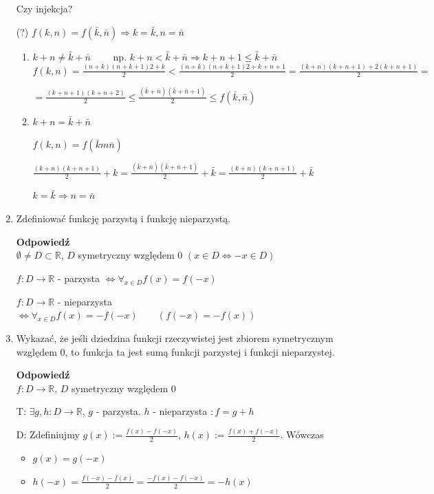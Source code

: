 \documentclass[12pt,a4paper]{article}
\theoremstyle{break}
\newcommand{\Odp}[1]{
		\begin{mdframed}[style=zadanie]
			\textbf{Odpowiedź}\\
			#1
		\end{mdframed}
	}
\begin{document}
\begin{enumerate}[1.]
{		Czy injekcja?	
		
		(?) $f(k,n) = f(\bar{k},\bar{n})\Rightarrow k=\bar{k}, n=\bar{n}$
		
		\begin{enumerate}[1$^\circ$]
			\item $k+n\neq \bar{k}+\bar{n} \qquad$ np. $k+n<\bar{k}+\bar{n} \Rightarrow k+n+1\leq \bar{k}+\bar{n}$\\
			
			$f(k,n)=\frac{{(n+k)(n+k+1)}{2}+k}{2}< \frac{{(n+k)(n+k+1)}{2}+k+n+1}{2} = \frac{(k+n)(k+n+1)+2(k+n+1)}{2}=$ 
			
			$=\frac{(k+n+1)(k+n+2)}{2}\leq \frac{(\bar{k}+\bar{n})(\bar{k}+\bar{n}+1)}{2}\leq f(\bar{k},\bar{n})$
			
			\item $k+n=\bar{k}+\bar{n}$
			
			$f(k,n)=f(\bar{k}m\bar{n})$
			
			$\frac{(k+n)(k+n+1)}{2}+k=\frac{(\bar{k}+\bar{n})(\bar{k}+\bar{n}+1)}{2}+\bar{k}=\frac{(k+n)(k+n+1)}{2}+\bar{k}$
			
			$k=\bar{k} \Rightarrow n=\bar{n}$
		\end{enumerate}
	}
	
	\item Zdeﬁniować funkcję parzystą i funkcję nieparzystą.
	\Odp{
		$\emptyset\neq D \subset \mathbb{R}$, $D$ symetryczny względem $0$ $(x\in D\Leftrightarrow -x\in D)$
		
		$f:D\rightarrow\mathbb{R}$ - parzysta $\Leftrightarrow \forall_{x\in D} f(x)=f(-x)$
		
		$f:D\rightarrow\mathbb{R}$ - nieparzysta $\Leftrightarrow \forall_{x\in D} f(x)=-f(-x) \qquad (f(-x)=-f(x))$
	}
	
	\item Wykazać, że jeśli dziedzina funkcji rzeczywistej jest zbiorem symetrycznym względem 0, to funkcja ta jest sumą funkcji parzystej i funkcji nieparzystej.
	\Odp{
		$f:D\rightarrow \mathbb{R}$, $D$ symetryczny względem $0$
		
		T: $\exists g,h : D\rightarrow \mathbb{R}$, $g$ - parzysta. $h$ - nieparzysta $: f=g+h$
		
		D: Zdefiniujmy $g(x):=\frac{f(x)-f(-x)}{2}$, $h(x):=\frac{f(x)+f(-x)}{2}$. Wówczas
		\begin{itemize}
			\item $g(x)=g(-x)$
			\item $h(-x)=\frac{f(-x)-f(x)}{2}=\frac{-f(x)-f(-x)}{2}=-h(x)$
		\end{itemize}
		
}
\end{enumerate}
\end{document}
